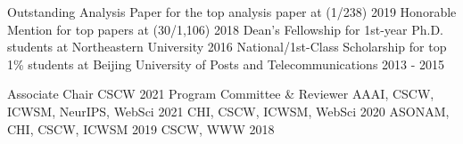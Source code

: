 \documentclass[letterpaper]{awesome-cv}
\begin{document}
\addvspace{2ex}
\begin{cventries}
  \cvaward
    {Outstanding Analysis Paper}
    {for the top analysis paper at  (1/238)}
    {2019}
  \cvaward
    {Honorable Mention}
    {for top papers at  (30/1,106)}
    {2018}
  \cvaward
    {Dean's Fellowship}
    {for 1st-year Ph.D. students at Northeastern University}
    {2016}
  \cvaward
    {National/1st-Class Scholarship}
    {for top 1\% students at Beijing University of Posts and Telecommunications}
    {2013 - 2015}
\end{cventries}

\addvspace{2ex}
\begin{cventries}
  \cvaward
    {Associate Chair}
    {CSCW}
    {2021}
  \cvaward
    {Program Committee \& Reviewer}
    {AAAI, CSCW, ICWSM, NeurIPS, WebSci}
    {2021}
  \cvaward
    {}
    {CHI, CSCW, ICWSM, WebSci}
    {2020}
  \cvaward
    {}
    {ASONAM, CHI, CSCW, ICWSM}
    {2019}
  \cvaward
    {}
    {CSCW, WWW}
    {2018}
\end{cventries}
\end{document}
